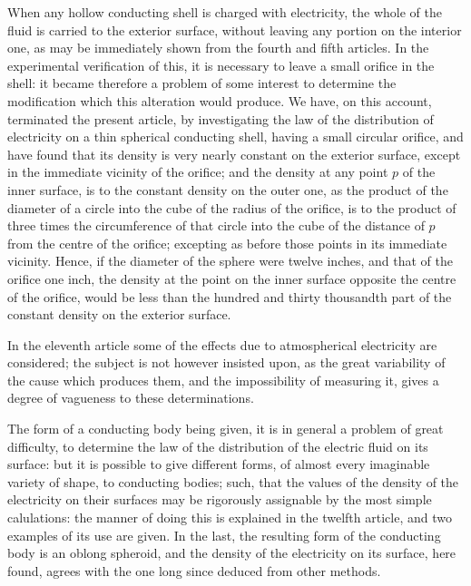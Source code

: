 \documentclass[11pt,notitlepage]{amsart}
\begin{document}
When any hollow conducting shell is charged with electricity, the whole
of the fluid is carried to the exterior surface,
without leaving any portion on
the interior one, as may be immediately shown
from the fourth and fifth articles.
In the experimental verification of this,
it is necessary to leave a small orifice
in the shell: it became therefore a problem of some interest to determine the
modification which this alteration would produce. We have, on this account,
terminated the present article,
by investigating the law of the distribution of
electricity on a thin spherical conducting shell,
having a small circular orifice,
and have found that its density is
very nearly constant on the exterior surface,
except in the immediate vicinity of the orifice; and the density at any
point $p$ of the inner surface, is to the constant density on the outer one, as
the product of the diameter of a circle
into the cube of the radius of the orifice,
is to the product of three times the circumference of that circle into the cube
of the distance of $p$ from the centre of the orifice; excepting as before those
points in its immediate vicinity. Hence, if the diameter of the sphere were
twelve inches, and that of the orifice one inch, the density at the point
on the inner surface opposite the centre of the orifice, would be less than
the hundred and thirty thousandth part of the constant density on the exterior
surface.

In the eleventh article some of the effects due to atmospherical electricity
are considered; the subject is not however insisted upon, as the great
variability of the cause which produces them, and the impossibility of measuring
it, gives a degree of vagueness to these determinations.

The form of a conducting body being given, it is in general a problem
of great difficulty,
to determine the law of the distribution of the electric fluid
on its surface: but it is possible to give different forms, of almost every 
imaginable variety of shape, to conducting bodies; such, that the values of the
density of the electricity on their surfaces may be rigorously assignable by
the most simple calulations:
the manner of doing this is explained in the twelfth
article, and two examples of its use are given. In the last, the resulting form
of the conducting body is an oblong spheroid, and the density of the 
electricity on its surface, here found,
agrees with the one long since deduced from
other methods.
\end{document}
